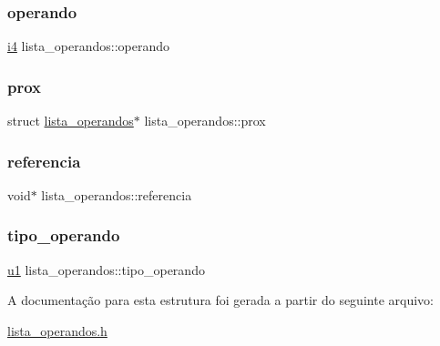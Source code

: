 \subsubsection{\texorpdfstring{operando}{operando}}
{\footnotesize\ttfamily \hyperlink{lista__operandos_8h_a7bc084923d20fddbe46335d882c6fda2}{i4} lista\+\_\+operandos\+::operando}

\mbox{\label{structlista__operandos_a90699e5c7f710177b37754cd5231c9f5}} 
\subsubsection{\texorpdfstring{prox}{prox}}
{\footnotesize\ttfamily struct \hyperlink{structlista__operandos}{lista\+\_\+operandos}$\ast$ lista\+\_\+operandos\+::prox}

\mbox{\label{structlista__operandos_a5efba56f9f00715a8c9558292b851d37}} 
\subsubsection{\texorpdfstring{referencia}{referencia}}
{\footnotesize\ttfamily void$\ast$ lista\+\_\+operandos\+::referencia}

\mbox{\label{structlista__operandos_af64bc84846f21a809f68b783f0e39f40}} 
\subsubsection{\texorpdfstring{tipo\+\_\+operando}{tipo\_operando}}
{\footnotesize\ttfamily \hyperlink{lista__operandos_8h_ad9f4cdb6757615aae2fad89dab3c5470}{u1} lista\+\_\+operandos\+::tipo\+\_\+operando}



A documentação para esta estrutura foi gerada a partir do seguinte arquivo\+:\begin{DoxyCompactItemize}
\item 
\hyperlink{lista__operandos_8h}{lista\+\_\+operandos.\+h}\end{DoxyCompactItemize}
